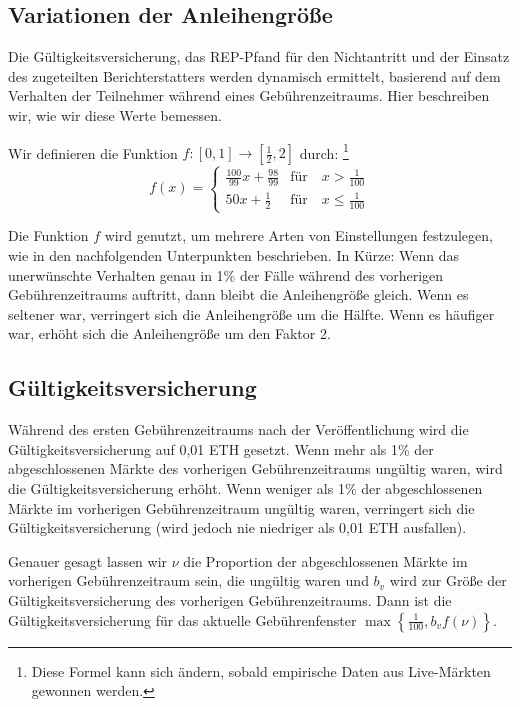 \documentclass[floatfix,reprint,nofootinbib,amsmath,amssymb,epsfig,pre,floats,letterpaper,groupedaffiliation]{revtex4-1}
\newcommand{\beq}{\begin{equation}}
\newcommand{\eeq}{\end{equation}}
\theoremstyle{definition}
\theoremstyle{definition}
\theoremstyle{definition}
\begin{document}
\begin{appendix}
\section{Variationen der Anleihengröße}\label{section:bond_size_adjustment_details}

Die Gültigkeitsversicherung, das REP-Pfand für den Nichtantritt und der Einsatz des zugeteilten Berichterstatters werden dynamisch ermittelt, basierend auf dem Verhalten der Teilnehmer während eines Gebührenzeitraums. Hier beschreiben wir, wie wir diese Werte bemessen.

Wir definieren die Funktion $f: [0, 1] \rightarrow [\frac{1}{2}, 2]$ durch: \footnote{Diese Formel kann sich ändern, sobald empirische Daten aus Live-Märkten gewonnen werden.}
\beq\label{eq:validity_bond_adjustment}
f(x) = \begin{cases} 
    \frac{100}{99} x + \frac{98}{99} & \text{für}\quad x > \frac{1}{100} \\
    50x + \frac{1}{2} & \text{für}\quad x \leq \frac{1}{100}
\end{cases}
\eeq

Die Funktion $f$ wird genutzt, um mehrere Arten von Einstellungen festzulegen, wie in den nachfolgenden Unterpunkten beschrieben. In Kürze: Wenn das unerwünschte Verhalten genau in 1\% der Fälle während des vorherigen Gebührenzeitraums auftritt, dann bleibt die Anleihengröße gleich. Wenn es seltener war, verringert sich die Anleihengröße um die Hälfte. Wenn es häufiger war, erhöht sich die Anleihengröße um den Faktor 2.

\subsection{Gültigkeitsversicherung}\label{section:bond_size_adjustment_details_validity_bonds}

Während des ersten Gebührenzeitraums nach der Veröffentlichung wird die Gültigkeitsversicherung auf 0,01 ETH gesetzt. Wenn mehr als 1\% der abgeschlossenen Märkte des vorherigen Gebührenzeitraums ungültig waren, wird die Gültigkeitsversicherung erhöht. Wenn weniger als 1\% der abgeschlossenen Märkte im vorherigen Gebührenzeitraum ungültig waren, verringert sich die Gültigkeitsversicherung (wird jedoch nie niedriger als 0,01 ETH ausfallen).

Genauer gesagt lassen wir $\nu$ die Proportion der abgeschlossenen Märkte im vorherigen Gebührenzeitraum sein, die ungültig waren und $b_v$ wird zur Größe der Gültigkeitsversicherung des vorherigen Gebührenzeitraums. Dann ist die Gültigkeitsversicherung für das aktuelle Gebührenfenster $\max\left\{\frac{1}{100}, b_v f(\nu)\right\}$.


\end{appendix}
\end{document}
